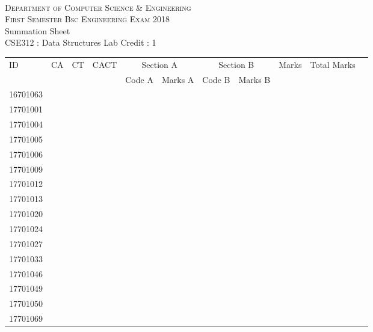 \documentclass[12pt]{article}
\begin{document}
    \centering
    \begin{minipage}[m]{.8\textwidth} \centering 
	\smallskip
	\\
	\textsc{Department of Computer Science \& Engineering}\\
	\textsc{ First Semester Bsc Engineering Exam 2018}\\
    {\large {\sc Summation Sheet}}\\  
     {\centering CSE312 : Data Structures Lab     Credit : 1 } \\
    \end{minipage} 
    \begin{center} 
	\renewcommand{\arraystretch}{1.08}
	\begin{small}
    \begin{tabular}{|l|c|c|c|c|c|c|c|c|c|c|} \hline
	\multirow{2}{*}{ID} & 	\multirow{2}{*}{CA}  & 	\multirow{2}{*}{CT}  & 	\multirow{2}{*}{CACT}  & \multicolumn{2 }{c|}{Section A}& \multicolumn{2 }{c|}{Section B} & 	\multirow{2}{*}{Marks}  & 	\multirow{2}{*}{Total Marks}  \\ 
	&  &  &  & Code A & Marks A & Code B & Marks B&  &  \\ \hline
16701063 &  &  &  &  &  &  &  &  & \\ \hline 
17701001 &  &  &  &  &  &  &  &  & \\ \hline 
17701004 &  &  &  &  &  &  &  &  & \\ \hline 
17701005 &  &  &  &  &  &  &  &  & \\ \hline 
17701006 &  &  &  &  &  &  &  &  & \\ \hline 
17701009 &  &  &  &  &  &  &  &  & \\ \hline 
17701012 &  &  &  &  &  &  &  &  & \\ \hline 
17701013 &  &  &  &  &  &  &  &  & \\ \hline 
17701020 &  &  &  &  &  &  &  &  & \\ \hline 
17701024 &  &  &  &  &  &  &  &  & \\ \hline 
17701027 &  &  &  &  &  &  &  &  & \\ \hline 
17701033 &  &  &  &  &  &  &  &  & \\ \hline 
17701046 &  &  &  &  &  &  &  &  & \\ \hline 
17701049 &  &  &  &  &  &  &  &  & \\ \hline 
17701050 &  &  &  &  &  &  &  &  & \\ \hline 
17701069 &  &  &  &  &  &  &  &  & \\ \hline 

\end{tabular}
\end{small}
\end{center}
\end{document}
